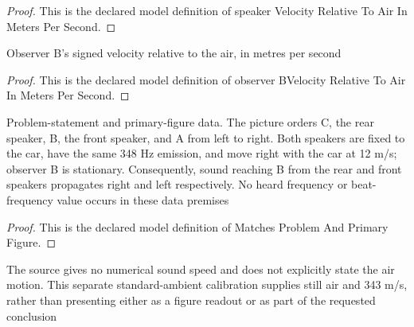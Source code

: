 \begin{proof}
  This is the declared model definition of speaker Velocity Relative To Air In Meters Per Second.
\end{proof}
\begin{definition}
  \label{def:physics:phyx-mini-0222:phyxminiproblems-problemphyxmini0222-observerbvelocityrelativetoairinmeterspersecond}
  Observer B's signed velocity relative to the air, in metres per second
\end{definition}
\begin{proof}
  This is the declared model definition of observer BVelocity Relative To Air In Meters Per Second.
\end{proof}
\begin{definition}
  \label{def:physics:phyx-mini-0222:phyxminiproblems-problemphyxmini0222-matchesproblemandprimaryfigure}
  Problem-statement and primary-figure data. The picture orders C, the rear speaker, B, the front speaker, and A from left to right. Both speakers are fixed to the car, have the same 348 Hz emission, and move right with the car at 12 m/s; observer B is stationary. Consequently, sound reaching B from the rear and front speakers propagates right and left respectively. No heard frequency or beat-frequency value occurs in these data premises
\end{definition}
\begin{proof}
  This is the declared model definition of Matches Problem And Primary Figure.
\end{proof}
\begin{definition}
  \label{def:physics:phyx-mini-0222:phyxminiproblems-problemphyxmini0222-usesstandardstillair}
  The source gives no numerical sound speed and does not explicitly state the air motion. This separate standard-ambient calibration supplies still air and 343 m/s, rather than presenting either as a figure readout or as part of the requested conclusion
\end{definition}
